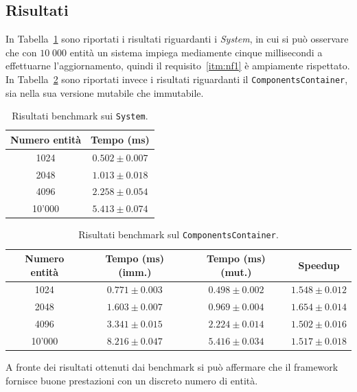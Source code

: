 \subsection{Risultati}\label{subsec:risultati}
In Tabella~\ref{tab:system-benchmark} sono riportati i risultati riguardanti i \textit{System}, in cui si può osservare
che con $10\;000$ entità un sistema impiega mediamente cinque millisecondi a effettuarne l'aggiornamento, quindi il
requisito~\ref{itm:nf1} è ampiamente rispettato.
In Tabella~\ref{tab:componentscontainer-benchmark} sono riportati invece i risultati riguardanti il
\texttt{ComponentsContainer}, sia nella sua versione mutabile che immutabile.

\begin{table}[htp]
    \centering
    \begin{tabular}{c c}
        \toprule
        Numero entità & Tempo (ms) \\ \midrule
        1024 & $0.502 \pm 0.007$ \\
        2048 & $1.013 \pm 0.018$ \\
        4096 & $2.258 \pm 0.054$ \\
        10'000 & $5.413 \pm 0.074$ \\
        \bottomrule
    \end{tabular}
    \caption{Risultati benchmark sui \texttt{System}.}\label{tab:system-benchmark}
\end{table}

\begin{table}[htp]
    \centering
    \begin{tabular}{c c c c}
        \toprule
        Numero entità & Tempo (ms) (imm.) & Tempo (ms) (mut.) & Speedup \\ \midrule
        1024 & $0.771 \pm 0.003$ & $0.498 \pm 0.002$ & $1.548 \pm 0.012$ \\
        2048 & $1.603 \pm 0.007$ & $0.969 \pm 0.004$ & $1.654 \pm 0.014$ \\
        4096 & $3.341 \pm 0.015$ & $2.224 \pm 0.014$ & $1.502 \pm 0.016$ \\
        10'000 & $8.216 \pm 0.047$ & $5.416 \pm 0.034$ & $1.517 \pm 0.018$ \\
        \bottomrule
    \end{tabular}
    \caption{Risultati benchmark sul \texttt{ComponentsContainer}.}\label{tab:componentscontainer-benchmark}
\end{table}

A fronte dei risultati ottenuti dai benchmark si può affermare che il framework fornisce buone prestazioni con un
discreto numero di entità.

